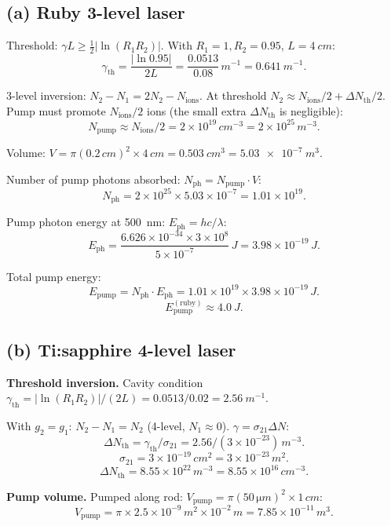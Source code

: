 \documentclass[11pt]{article}
\begin{document}
\subsection*{(a) Ruby 3-level laser}

Threshold: $\gamma L \geq \tfrac12 |\ln(R_1 R_2)|$. With $R_1=1, R_2=0.95$,
$L = \SI{4}{cm}$:
\[
\gamma_{\text{th}} = \frac{|\ln 0.95|}{2 L} = \frac{0.0513}{0.08}\,\si{m^{-1}} = \SI{0.641}{m^{-1}}.
\]

3-level inversion: $N_2 - N_1 = 2 N_2 - N_{\text{ions}}$. At threshold $N_2 \approx N_{\text{ions}}/2 + \Delta N_{\text{th}}/2$. Pump must promote $N_{\text{ions}}/2$ ions (the small extra $\Delta N_{\text{th}}$ is negligible):
\[
N_{\text{pump}} \approx N_{\text{ions}}/2 = 2\times 10^{19}\,\si{cm^{-3}} = 2\times 10^{25}\,\si{m^{-3}}.
\]

Volume: $V = \pi(0.2\,\si{cm})^2\times 4\,\si{cm} = \SI{0.503}{cm^3} = \SI{5.03e-7}{m^3}$.

Number of pump photons absorbed: $N_{\text{ph}} = N_{\text{pump}}\cdot V$:
\[
N_{\text{ph}} = 2\times 10^{25}\times 5.03\times 10^{-7} = 1.01\times 10^{19}.
\]

Pump photon energy at \SI{500}{nm}: $E_{\text{ph}} = hc/\lambda$:
\[
E_{\text{ph}} = \frac{6.626\times 10^{-34}\times 3\times 10^8}{5\times 10^{-7}}\,\si{J} = 3.98\times 10^{-19}\,\si{J}.
\]

Total pump energy:
\[
E_{\text{pump}} = N_{\text{ph}}\cdot E_{\text{ph}} = 1.01\times 10^{19}\times 3.98\times 10^{-19}\,\si{J}.
\]
\[
\boxed{\;E_{\text{pump}}^{(\text{ruby})} \approx \SI{4.0}{J}.\;}
\]

\subsection*{(b) Ti:sapphire 4-level laser}

\textbf{Threshold inversion.} Cavity condition $\gamma_{\text{th}} = |\ln(R_1 R_2)|/(2L) = 0.0513/0.02 = \SI{2.56}{m^{-1}}$.

With $g_2=g_1$: $N_2 - N_1 = N_2$ (4-level, $N_1\approx 0$). $\gamma = \sigma_{21}\Delta N$:
\[
\Delta N_{\text{th}} = \gamma_{\text{th}}/\sigma_{21} = 2.56/(3\times 10^{-23})\,\si{m^{-3}}.
\]
\[
\sigma_{21} = 3\times 10^{-19}\,\si{cm^2} = 3\times 10^{-23}\,\si{m^2}.
\]
\[
\Delta N_{\text{th}} = 8.55\times 10^{22}\,\si{m^{-3}} = 8.55\times 10^{16}\,\si{cm^{-3}}.
\]

\textbf{Pump volume.} Pumped along rod: $V_{\text{pump}} = \pi(50\,\si{\micro m})^2\times 1\,\si{cm}$:
\[
V_{\text{pump}} = \pi\times 2.5\times 10^{-9}\,\si{m^2}\times 10^{-2}\,\si{m} = 7.85\times 10^{-11}\,\si{m^3}.
\]
\end{document}
